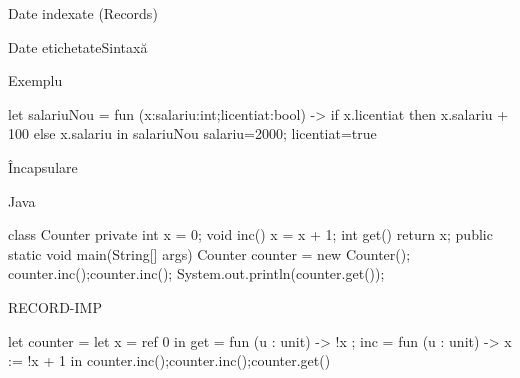 \documentclass[xcolor=pdftex,romanian,colorlinks]{beamer}
\begin{document}
\begin{section}{Date indexate (Records)}
\begin{frame}[fragile]{Date etichetate}{Sintaxă}

\begin{block}{Exemplu}
\hfill\begin{minipage}{.75\columnwidth}
\begin{asciiml}
let salariuNou = fun (x:{salariu:int;licentiat:bool}) 
   -> if x.licentiat then x.salariu + 100
                     else x.salariu
in salariuNou {salariu=2000; licentiat=true }
\end{asciiml}
\end{minipage}
\hfill\;
\end{block}
\end{frame}

\begin{frame}[fragile]{Încapsulare}
\begin{block}{Java}
\vspace{-2ex}\hspace{2em}\begin{minipage}{.8\columnwidth}
\begin{asciijava}
class Counter {
  private int x = 0;
  void inc() { x = x + 1; }
  int get() { return x; }
  public static void main(String[] args) {
    Counter counter = new Counter();
    counter.inc();counter.inc(); System.out.println(counter.get());
  }
}
\end{asciijava}
\end{minipage}
\end{block}

\begin{block}{RECORD-IMP}
\vspace{-2ex}\hspace{2em}\begin{minipage}{.8\columnwidth}
\begin{asciiml}
let counter = let x = ref 0 in {
  get = fun (u : unit) -> !x ;
  inc = fun (u : unit) -> x := !x + 1 
} 
in counter.inc();counter.inc();counter.get()      
\end{asciiml}
\end{minipage}
\end{block}
\end{frame}



\end{section}
\end{document}

